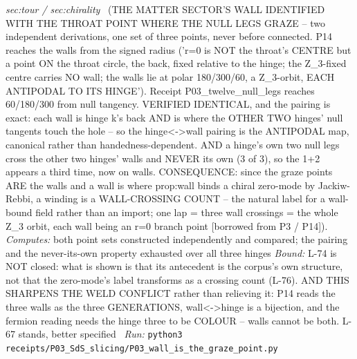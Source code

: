 \begin{description}
\textit{sec:tour / sec:chirality} \ (THE MATTER SECTOR'S WALL IDENTIFIED WITH THE THROAT POINT WHERE THE NULL LEGS GRAZE -- two independent derivations, one set of three points, never before connected. P14 reaches the walls from the signed radius ('r=0 is NOT the throat's CENTRE but a point ON the throat circle, the back, fixed relative to the hinge; the Z\_3-fixed centre carries NO wall; the walls lie at polar 180/300/60, a Z\_3-orbit, EACH ANTIPODAL TO ITS HINGE'). Receipt P03\_twelve\_null\_legs reaches 60/180/300 from null tangency. VERIFIED IDENTICAL, and the pairing is exact: each wall is hinge k's back AND is where the OTHER TWO hinges' null tangents touch the hole -- so the hinge<->wall pairing is the ANTIPODAL map, canonical rather than handedness-dependent. AND a hinge's own two null legs cross the other two hinges' walls and NEVER its own (3 of 3), so the 1+2 appears a third time, now on walls. CONSEQUENCE: since the graze points ARE the walls and a wall is where prop:wall binds a chiral zero-mode by Jackiw-Rebbi, a winding is a WALL-CROSSING COUNT -- the natural label for a wall-bound field rather than an import; one lap = three wall crossings = the whole Z\_3 orbit, each wall being an r=0 branch point [borrowed from P3 / P14]). 
\emph{Computes:} both point sets constructed independently and compared; the pairing and the never-its-own property exhausted over all three hinges
 \emph{Bound:} L-74 is NOT closed: what is shown is that its antecedent is the corpus's own structure, not that the zero-mode's label transforms as a crossing count (L-76). AND THIS SHARPENS THE WELD CONFLICT rather than relieving it: P14 reads the three walls as the three GENERATIONS, wall<->hinge is a bijection, and the fermion reading needs the hinge three to be COLOUR -- walls cannot be both. L-67 stands, better specified
\ \emph{Run:} \texttt{python3 receipts/P03\_SdS\_slicing/P03\_wall\_is\_the\_graze\_point.py}
\end{description}\endgroup
